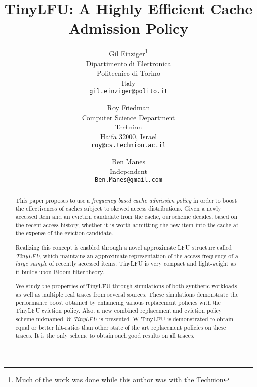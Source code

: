 \documentclass[10pt,a4paper]{article}
\begin{document}
\title{TinyLFU: A Highly Efficient Cache Admission Policy}
\date{}
\author{
	Gil Einziger\thanks{Much of the work was done while this author was with the Technion}\\
    Dipartimento di Elettronica\\
    Politecnico di Torino\\
    Italy\\
    \texttt{gil.einziger@polito.it}
\and
    Roy Friedman\\
    Computer Science Department\\
    Technion\\
    Haifa 32000, Israel\\
    \texttt{roy@cs.technion.ac.il}
\and
    Ben Manes\\
    Independent\\
    \texttt{Ben.Manes@gmail.com}
}
\maketitle

\begin{abstract}
This paper proposes to use a \emph{frequency based cache admission policy} in order to boost the effectiveness of caches subject to skewed access distributions.
Given a newly accessed item and an eviction candidate from the cache, our scheme decides, based on the recent access history, whether it is worth admitting the new item into the cache at the expense of the eviction candidate.


Realizing this concept is enabled through a novel approximate LFU structure called \emph{TinyLFU}, which maintains an approximate representation of the access frequency of a \emph{large sample} of recently accessed items.
TinyLFU is very compact and light-weight as it builds upon Bloom filter theory.

We study the properties of TinyLFU through simulations of both synthetic workloads as well as multiple real traces from several sources.
These simulations demonstrate the performance boost obtained by enhancing various replacement policies with the TinyLFU eviction policy.
Also, a new combined replacement and eviction policy scheme nicknamed \emph{W-TinyLFU} is presented.
W-TinyLFU is demonstrated to obtain equal or better hit-ratios than other state of the art replacement policies on these traces.
It is the only scheme to obtain such good results on all traces.
\end{abstract}

\thispagestyle{empty}
\end{document}
